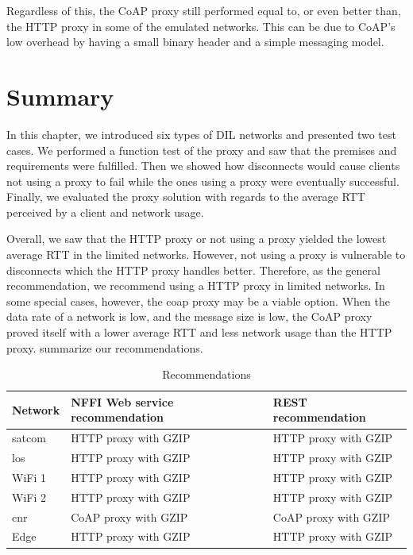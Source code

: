 Regardless of this, the CoAP proxy still performed equal to, or even better
than, the HTTP proxy in some of the emulated networks. This can be due to CoAP's
low overhead by having a small binary header and a simple messaging model.


\section{Summary}

In this chapter, we introduced six types of DIL networks and presented two test
cases. We performed a function test of the proxy and saw that the premises and
requirements were fulfilled. Then we showed how disconnects would cause clients
not using a proxy to fail while the ones using a proxy were eventually
successful. Finally, we evaluated the proxy solution with regards to the average
RTT perceived by a client and network usage.

 Overall, we saw that the HTTP proxy or not using a proxy yielded the lowest
 average RTT in the limited networks. However, not using a proxy is vulnerable
 to disconnects which the HTTP proxy handles better. Therefore, as the general
 recommendation, we recommend using a HTTP proxy in limited networks. In some
 special cases, however, the \gls{coap} proxy may be a viable option. When the
 data rate of a network is low, and the message size is low, the CoAP proxy
 proved itself with a lower average RTT and less network usage than the HTTP
 proxy.  summarize our recommendations.

\begin{table}[h]
\begin{tabularx}{\textwidth}{| l | X | X |}
\hline
  \textbf{Network} & \textbf{NFFI Web service recommendation} & \textbf{REST recommendation}\\ \hline
  \gls{satcom} & HTTP proxy with GZIP & HTTP proxy with GZIP \\ \hline
  \gls{los} & HTTP proxy with GZIP  & HTTP proxy with GZIP \\ \hline
  WiFi 1 & HTTP proxy with GZIP & HTTP proxy with GZIP \\ \hline
  WiFi 2 & HTTP proxy with GZIP & HTTP proxy with GZIP \\ \hline
  \gls{cnr} & CoAP proxy with GZIP & CoAP proxy with GZIP \\ \hline
  Edge & HTTP proxy with GZIP & HTTP proxy with GZIP \\ \hline
\end{tabularx}
\caption{Recommendations}
\label{table-evaluation-summary}
\end{table}
